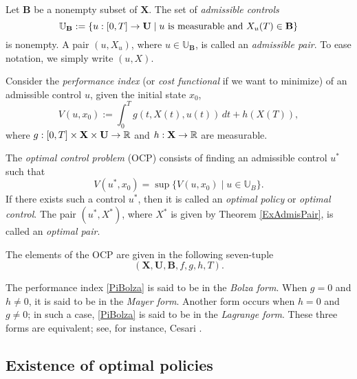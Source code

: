 \begin{assumption}\rm Let $\mathbf{B}$ be a nonempty subset of $\mathbf{X}$. 
	The set of {\it admissible controls} 
	\begin{equation}\label{FeasCont}  
		 \mathbb{U}_\mathbf{B}:=\{u:[0,T]\to \mathbf{U}\mid u\  
		 \mbox{\rm is measurable and } X_u(T)\in \mathbf{B}\} 
	\end{equation}
	is nonempty. A pair $(u,X_u)$, where $u\in \mathbb{U}_\mathbf{B}$, is called an 
	{\it admissible pair}. To ease notation, we simply write $(u,X)$.
\end{assumption}


Consider the {\it performance index} (or {\it cost functional} if we want to minimize) of an admissible control $u$, given the initial state $x_0$, 
        \begin{equation}\label{PiBolza} V(u,x_0) := \int_0^Tg(t,X(t),u(t))\,dt + h(X(T)),\end{equation}
where $g:[0,T]\times \mathbf{X}\times \mathbf{U}\to \mathbb{R}$ and $h:\mathbf{X}\to\mathbb{R}$ are measurable.

The {\it optimal control problem} (OCP) consists of finding an admissible control $u^\ast$ such that
\[ V(u^\ast,x_0)=\sup\{ V(u,x_0)\mid u\in \mathbb{U}_B \}.\]
If there exists such a control $u^\ast$, then it is called an {\it optimal policy} or {\it optimal control}. The pair $(u^\ast,X^\ast)$, where $X^\ast$ is given by Theorem \ref{ExAdmisPair}, is called an {\it optimal pair}.

The elements of the OCP are given in the following seven-tuple 
   \begin{equation}\label{OCP}
       (\mathbf{X},\mathbf{U},\mathbf{B},f,g,h,T).
   \end{equation}



\begin{remark}\rm
The performance index \eqref{PiBolza} is said to be in the {\it Bolza form}. When $g= 0$ and $h\neq 0$, it is said to be in the {\it Mayer form}. Another form occurs when $h= 0$ and $g\neq 0$; in such a case, \eqref{PiBolza} is said to be in the {\it Lagrange form}. These three forms are equivalent; see, for instance, Cesari \cite[Sect. 1.9]{Cesari83}. 
\end{remark} 


\subsection{Existence of optimal policies}

